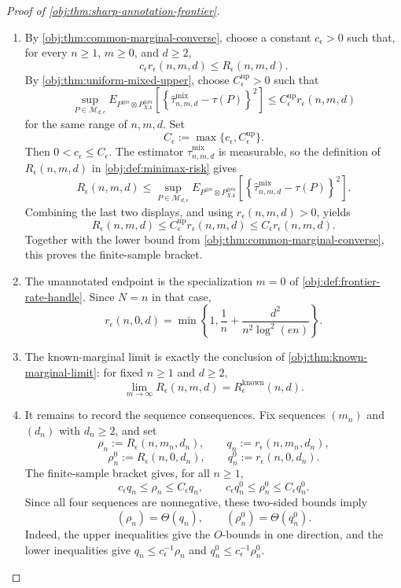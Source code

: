 \begin{proof}[Proof of \cref{obj:thm:sharp-annotation-frontier}]
\begin{enumerate}
\item By \cref{obj:thm:common-marginal-converse}, choose a constant \(c_\epsilon>0\) such that, for every \(n\ge1\), \(m\ge0\), and \(d\ge2\),
\[
c_\epsilon r_\epsilon(n,m,d)\le R_\epsilon(n,m,d).
\]
By \cref{obj:thm:uniform-mixed-upper}, choose \(C_\epsilon^{\mathrm{up}}>0\) such that
\[
\sup_{P\in\mathcal M_{d,\epsilon}}
E_{P^{\otimes n}\otimes P_{XA}^{\otimes m}}
\!\left[
\left\{\widehat\tau^{\mathrm{mix}}_{n,m,d}-\tau(P)\right\}^2
\right]
\le
C_\epsilon^{\mathrm{up}} r_\epsilon(n,m,d)
\]
for the same range of \(n,m,d\).  Set
\[
C_\epsilon:=\max\{c_\epsilon,C_\epsilon^{\mathrm{up}}\}.
\]
Then \(0<c_\epsilon\le C_\epsilon\).  The estimator
\(\widehat\tau^{\mathrm{mix}}_{n,m,d}\) is measurable, so the definition of
\(R_\epsilon(n,m,d)\) in \cref{obj:def:minimax-risk} gives
\[
R_\epsilon(n,m,d)
\le
\sup_{P\in\mathcal M_{d,\epsilon}}
E_{P^{\otimes n}\otimes P_{XA}^{\otimes m}}
\!\left[
\left\{\widehat\tau^{\mathrm{mix}}_{n,m,d}-\tau(P)\right\}^2
\right].
\]
Combining the last two displays, and using \(r_\epsilon(n,m,d)>0\), yields
\[
R_\epsilon(n,m,d)
\le
C_\epsilon^{\mathrm{up}} r_\epsilon(n,m,d)
\le
C_\epsilon r_\epsilon(n,m,d).
\]
Together with the lower bound from \cref{obj:thm:common-marginal-converse}, this proves the finite-sample bracket. %

\item The unannotated endpoint is the specialization \(m=0\) of \cref{obj:def:frontier-rate-handle}.  Since \(N=n\) in that case,
\[
r_\epsilon(n,0,d)
=
\min\!\left\{1,\frac1n+\frac{d^2}{n^2\log^2(en)}\right\}.
\]

\item The known-marginal limit is exactly the conclusion of \cref{obj:thm:known-marginal-limit}: for fixed \(n\ge1\) and \(d\ge2\),
\[
\lim_{m\to\infty} R_\epsilon(n,m,d)
=
R_\epsilon^{\mathrm{known}}(n,d).
\]

\item It remains to record the sequence consequences.  Fix sequences \((m_n)\) and \((d_n)\) with \(d_n\ge2\), and set
\[
\rho_n:=R_\epsilon(n,m_n,d_n),\qquad
q_n:=r_\epsilon(n,m_n,d_n),
\]
\[
\rho_n^{0}:=R_\epsilon(n,0,d_n),\qquad
q_n^{0}:=r_\epsilon(n,0,d_n).
\]
The finite-sample bracket gives, for all \(n\ge1\),
\[
c_\epsilon q_n\le \rho_n\le C_\epsilon q_n,
\qquad
c_\epsilon q_n^{0}\le \rho_n^{0}\le C_\epsilon q_n^{0}.
\]
Since all four sequences are nonnegative, these two-sided bounds imply
\[
(\rho_n)=\Theta(q_n),
\qquad
(\rho_n^{0})=\Theta(q_n^{0}).
\]
Indeed, the upper inequalities give the \(O\)-bounds in one direction, and the lower inequalities give
\(q_n\le c_\epsilon^{-1}\rho_n\) and
\(q_n^{0}\le c_\epsilon^{-1}\rho_n^{0}\). %


\end{enumerate}
\end{proof}
